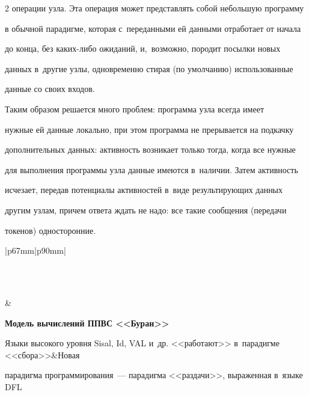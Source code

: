 \begin{multicols}{2}
операции узла. Эта операция может представлять собой небольшую программу 

в обычной парадигме, которая с~переданными ей данными отработает от начала 

до конца, без ка\-ких-ли\-бо ожиданий, и,~возможно, породит посылки новых 

данных в~другие узлы, одновременно стирая (по умолчанию) использованные 

данные со своих входов.

  

  Таким образом решается много проблем: программа узла всегда имеет 

нужные ей данные локально, при этом программа не прерывается на подкачку 

дополнительных данных: активность возникает только тогда, когда все нужные 

для выполнения программы узла данные имеются в~наличии. Затем активность 

исчезает, передав потенциалы активностей в~виде результирующих данных 

другим узлам, причем ответа ждать не надо: все такие сообщения (передачи 

токенов) односторонние.



\begin{table}\small

\begin{center}

\begin{tabular}{|p{67mm}|p{90mm}|}

\\

\\[-6pt]

\hline

&

{\textbf{Модель вычислений ППВС <<Буран>>}}\\

\hline

Языки высокого уровня Sisal, Id, VAL и~др. <<работают>> в~парадигме <<сбора>>&Новая 

парадигма программирования~--- парадигма <<раздачи>>, выраженная в~языке DFL\\

\hline


\end{tabular}
\end{center}
\end{table}
\end{multicols}
